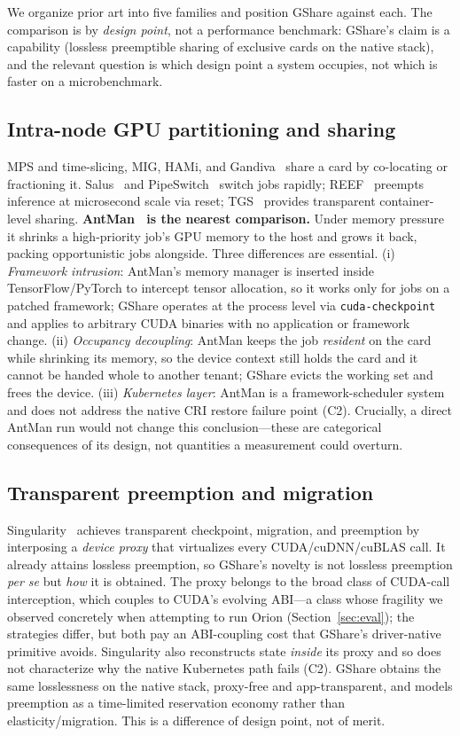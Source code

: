 \documentclass[preprint,12pt]{elsarticle}
\begin{document}
We organize prior art into five families and position GShare against each. The comparison is by
\emph{design point}, not a performance benchmark: GShare's claim is a capability (lossless preemptible
sharing of exclusive cards on the native stack), and the relevant question is which design point a system
occupies, not which is faster on a microbenchmark.

\subsection{Intra-node GPU partitioning and sharing}
MPS and time-slicing, MIG, HAMi, and Gandiva~\cite{gandiva} share a card by co-locating or fractioning it.
Salus~\cite{salus} and PipeSwitch~\cite{pipeswitch} switch jobs rapidly; REEF~\cite{reef} preempts
inference at microsecond scale via reset; TGS~\cite{tgs} provides transparent container-level sharing.
\textbf{AntMan~\cite{antman} is the nearest comparison.} Under memory pressure it shrinks a high-priority
job's GPU memory to the host and grows it back, packing opportunistic jobs alongside. Three differences are
essential. (i) \emph{Framework intrusion}: AntMan's memory manager is inserted inside TensorFlow/PyTorch to
intercept tensor allocation, so it works only for jobs on a patched framework; GShare operates at the
process level via \texttt{cuda-checkpoint} and applies to arbitrary CUDA binaries with no application or
framework change. (ii) \emph{Occupancy decoupling}: AntMan keeps the job \emph{resident} on the card while
shrinking its memory, so the device context still holds the card and it cannot be handed whole to another
tenant; GShare evicts the working set and frees the device. (iii) \emph{Kubernetes layer}: AntMan is a
framework-scheduler system and does not address the native CRI restore failure point (C2). Crucially, a
direct AntMan run would not change this conclusion---these are categorical consequences of its design, not
quantities a measurement could overturn.

\subsection{Transparent preemption and migration}
Singularity~\cite{singularity} achieves transparent checkpoint, migration, and preemption by interposing a
\emph{device proxy} that virtualizes every CUDA/cuDNN/cuBLAS call. It already attains lossless preemption,
so GShare's novelty is not lossless preemption \emph{per se} but \emph{how} it is obtained. The proxy
belongs to the broad class of CUDA-call interception, which couples to CUDA's evolving ABI---a class whose
fragility we observed concretely when attempting to run Orion (Section~\ref{sec:eval}); the strategies
differ, but both pay an ABI-coupling cost that GShare's driver-native primitive avoids. Singularity also
reconstructs state \emph{inside} its proxy and so does not characterize why the native Kubernetes path
fails (C2). GShare obtains the same losslessness on the native stack, proxy-free and app-transparent, and
models preemption as a time-limited reservation economy rather than elasticity/migration. This is a
difference of design point, not of merit.
\end{document}
